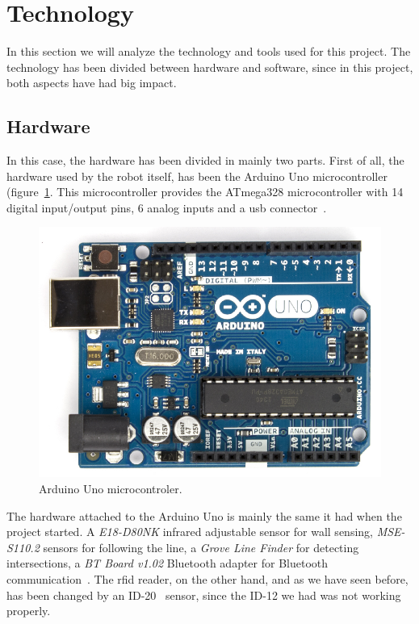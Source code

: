 \clearpage
\section{Technology}

In this section we will analyze the technology and tools used for this project. The technology has
been divided between hardware and software, since in this project, both aspects have had big impact.

\subsection{Hardware}

In this case, the hardware has been divided in mainly two parts. First of all, the hardware used by
the robot itself, has been the Arduino Uno microcontroller (figure~\ref{fig:arduino_board}. This
microcontroller provides the ATmega328 microcontroller with 14 digital input/output pins, 6 analog
inputs and a \acrshort{usb} connector~\cite{arduino_datasheet}.

\begin{figure}[!htbp]
	\centering
	\includegraphics[height=0.3\textheight]{fig/arduino-board}
	\caption{Arduino Uno microcontroler.}
	\label{fig:arduino_board}
\end{figure}

The hardware attached to the Arduino Uno is mainly the same it had when the project started. A
\emph{E18-D80NK} infrared adjustable sensor for wall sensing, \emph{MSE-S110.2} sensors for
following the line, a \emph{Grove Line Finder} for detecting intersections, a
\emph{BT Board v1.02} Bluetooth adapter for Bluetooth communication~\cite{fdp_itu}. The
\acrshort{rfid} reader, on the other hand, and as we have seen before, has been changed by an
ID-20~\cite{rfid} sensor, since the ID-12 we had was not working properly.

